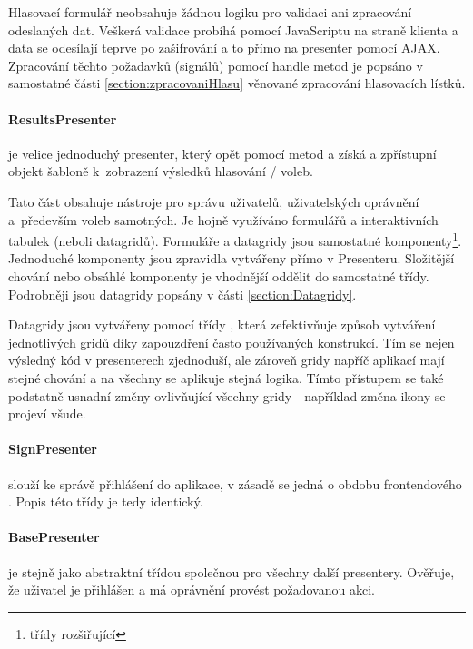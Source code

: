 Hlasovací formulář neobsahuje žádnou logiku pro validaci ani zpracování odeslaných dat. Veškerá validace probíhá pomocí JavaScriptu na straně klienta a data se odesílají teprve po zašifrování a to přímo na presenter pomocí AJAX. Zpracování těchto požadavků (signálů) pomocí handle metod je popsáno v samostatné části \ref{section:zpracovaniHlasu} věnované zpracování hlasovacích lístků.


\paragraph{ResultsPresenter} je velice jednoduchý presenter, který opět pomocí metod  a  získá a zpřístupní objekt  šabloně k~zobrazení výsledků hlasování / voleb.


Tato část obsahuje nástroje pro správu uživatelů, uživatelských oprávnění a~především voleb samotných. Je hojně využíváno formulářů a interaktivních tabulek (neboli datagridů). Formuláře a datagridy jsou samostatné komponenty\footnote{třídy rozšiřující }. Jednoduché komponenty jsou zpravidla vytvářeny přímo v Presenteru. Složitější chování nebo obsáhlé komponenty je vhodnější oddělit do samostatné třídy. Podrobněji jsou datagridy popsány v části \ref{section:Datagridy}.

Datagridy jsou vytvářeny pomocí třídy , která zefektivňuje způsob vytváření jednotlivých gridů díky zapouzdření často používaných konstrukcí. Tím se nejen výsledný kód v presenterech zjednoduší, ale zároveň gridy napříč aplikací mají stejné chování a na všechny se aplikuje stejná logika. Tímto přístupem se také podstatně usnadní změny ovlivňující všechny gridy - například změna ikony se projeví všude.


\paragraph{SignPresenter} slouží ke správě přihlášení do aplikace, v zásadě se jedná o obdobu frontendového . Popis této třídy je tedy identický.


\paragraph{BasePresenter} je stejně jako  abstraktní třídou společnou pro všechny další presentery. Ověřuje, že uživatel je přihlášen a má oprávnění provést požadovanou akci.


